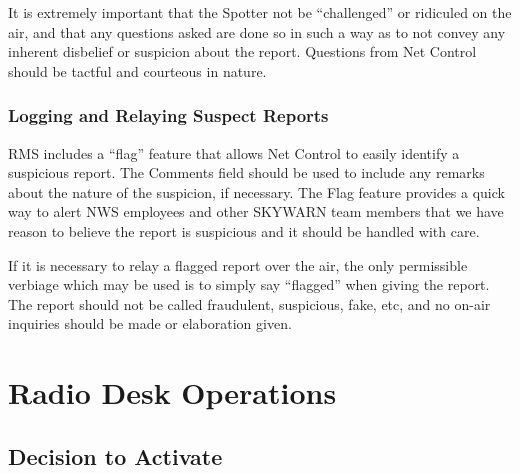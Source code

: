 \documentclass[pdflatex,letterpaper,twoside,12pt]{book}
\begin{document}
It is extremely important that the Spotter not be ``challenged'' or ridiculed on the air, and that any questions asked are done so in such a way as to not convey any inherent disbelief or suspicion about the report. Questions from Net Control should be tactful and courteous in nature.

\subsection{Logging and Relaying Suspect Reports}

RMS includes a ``flag'' feature that allows Net Control to easily identify a suspicious report.  The Comments field should be used to include any remarks about the nature of the suspicion, if necessary.  The Flag feature provides a quick way to alert NWS employees and other SKYWARN team members that we have reason to believe the report is suspicious and it should be handled with care.

If it is necessary to relay a flagged report over the air, the only permissible verbiage which may be used is to simply say ``flagged'' when giving the report.  The report should not be called fraudulent, suspicious, fake, etc, and no on-air inquiries should be made or elaboration given.



\chapter{Radio Desk Operations}


\section{Decision to Activate}
\end{document}
